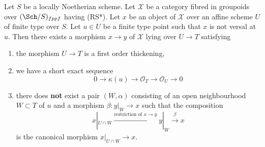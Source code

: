 \begin{lemma}
\label{lemma-single-point}
Let $S$ be a locally Noetherian scheme. Let $\mathcal{X}$ be a category
fibred in groupoids over $(\Sch/S)_{fppf}$ having (RS*).
Let $x$ be an object of $\mathcal{X}$ over an affine scheme $U$
of finite type over $S$. Let $u \in U$ be a finite type point such that
$x$ is not versal at $u$. Then there exists a morphism $x \to y$
of $\mathcal{X}$ lying over $U \to T$ satisfying
\begin{enumerate}
\item the morphism $U \to T$ is a first order thickening,
\item we have a short exact sequence
$$
0 \to \kappa(u) \to \mathcal{O}_T \to \mathcal{O}_U \to 0
$$
\item there does {\bf not} exist a pair $(W, \alpha)$
consisting of an open neighbourhood $W \subset T$ of $u$
and a morphism $\beta : y|_W \to x$ such that the composition
$$
x|_{U \cap W} \xrightarrow{\text{restriction of }x \to y}
y|_W \xrightarrow{\beta} x
$$
is the canonical morphism $x|_{U \cap W} \to x$.
\end{enumerate}
\end{lemma}

